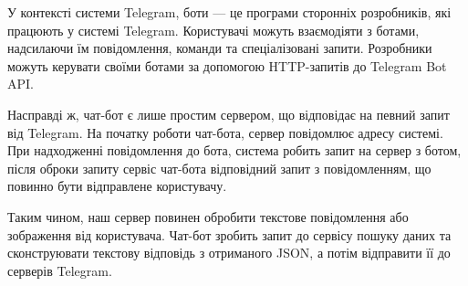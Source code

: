 У контексті системи Telegram, боти — це програми сторонніх розробників,
які працюють у системі Telegram.
Користувачі можуть взаємодіяти з ботами, надсилаючи їм повідомлення,
команди та спеціалізовані запити.
Розробники можуть керувати своїми ботами за допомогою HTTP-запитів до Telegram Bot API.

Насправді ж, чат-бот є лише простим сервером, що відповідає на певний запит від Telegram.
На початку роботи чат-бота, сервер повідомлює адресу системі.
При надходженні повідомлення до бота, система робить запит на сервер з ботом,
після оброки запиту сервіс чат-бота відповідний запит з повідомленням, що повинно бути
відправлене користувачу.

Таким чином, наш сервер повинен обробити текстове повідомлення або зображення від користувача.
Чат-бот зробить запит до сервісу пошуку даних та сконструювати
текстову відповідь з отриманого JSON, а потім відправити її до серверів Telegram.

